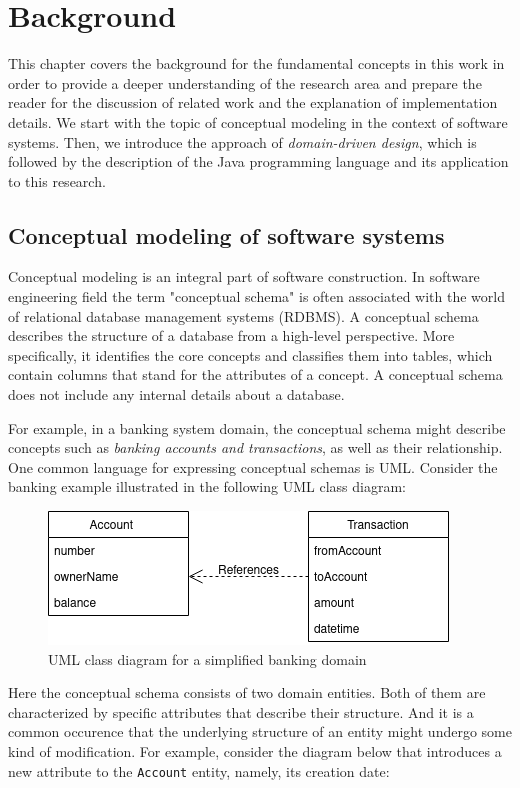 \chapter{Background}
This chapter covers the background for the fundamental concepts in this work in order to provide a deeper understanding of the research area and prepare the reader for the discussion of related work and the explanation of implementation details.
We start with the topic of conceptual modeling in the context of software systems.
Then, we introduce the approach of \textit{domain-driven design}, which is followed by the description of the Java programming language and its application to this research.

\section{Conceptual modeling of software systems}
Conceptual modeling is an integral part of software construction.
In software engineering field the term "conceptual schema" is often associated with the world of relational database management systems (RDBMS).
A conceptual schema describes the structure of a database from a high-level perspective.
More specifically, it identifies the core concepts and classifies them into tables, which contain columns that stand for the attributes of a concept.
A conceptual schema does not include any internal details about a database.

\n

For example, in a banking system domain, the conceptual schema might describe concepts such as \textit{banking accounts and transactions}, as well as their relationship.
One common language for expressing conceptual schemas is UML.
Consider the banking example illustrated in the following UML class diagram:

\begin{figure}[H]\centering
    \includegraphics[scale=0.65]{images/banking.drawio.png}
    \caption{UML class diagram for a simplified banking domain}\label{fig:bank}
\end{figure}

Here the conceptual schema consists of two domain entities.
Both of them are characterized by specific attributes that describe their structure.
And it is a common occurence that the underlying structure of an entity might undergo some kind of modification.
For example, consider the diagram below that introduces a new attribute to the \texttt{Account} entity, namely, its creation date:

